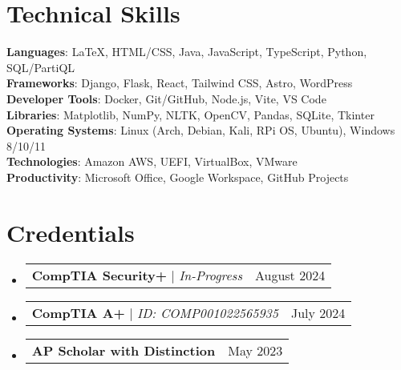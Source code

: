 \documentclass[letterpaper,11pt]{article}
\makeatletter
\newcommand{\resumeProjectHeading}[2]{
    \item
    \begin{tabular*}{0.97\textwidth}{l@{\extracolsep{\fill}}r}
      \small#1 & #2 \\
    \end{tabular*}\vspace{-7pt}
}
\newcommand{\resumeSubHeadingListStart}{\begin{itemize}[leftmargin=0.15in, label={}]}
\newcommand{\resumeSubHeadingListEnd}{\end{itemize}}
\makeatother
\begin{document}
\section{Technical Skills}
 \begin{itemize}[leftmargin=0.15in, label={}]
    \small{\item{
     \textbf{Languages}{: LaTeX, HTML/CSS, Java, JavaScript, TypeScript, Python, SQL/PartiQL} \\
     \textbf{Frameworks}{: Django, Flask, React, Tailwind CSS, Astro, WordPress} \\
     \textbf{Developer Tools}{: Docker, Git/GitHub, Node.js, Vite, VS Code} \\
     \textbf{Libraries}{: Matplotlib, NumPy, NLTK, OpenCV, Pandas, SQLite, Tkinter} \\
     \textbf{Operating Systems}{: Linux (Arch, Debian, Kali, RPi OS, Ubuntu), Windows 8/10/11} \\
     \textbf{Technologies}{: Amazon AWS, UEFI, VirtualBox, VMware} \\
     \textbf{Productivity}{: Microsoft Office, Google Workspace, GitHub Projects}
    }}
 \end{itemize}

\section{Credentials}
  \resumeSubHeadingListStart
    \resumeProjectHeading
      {\textbf{CompTIA Security+} $|$ \emph{In-Progress}}{August 2024}
    \resumeProjectHeading
      {\textbf{CompTIA A+} $|$ \emph{ID: COMP001022565935}}{July 2024}
    \resumeProjectHeading
      {\textbf{AP Scholar with Distinction}}{May 2023}
  \resumeSubHeadingListEnd



\end{document}
